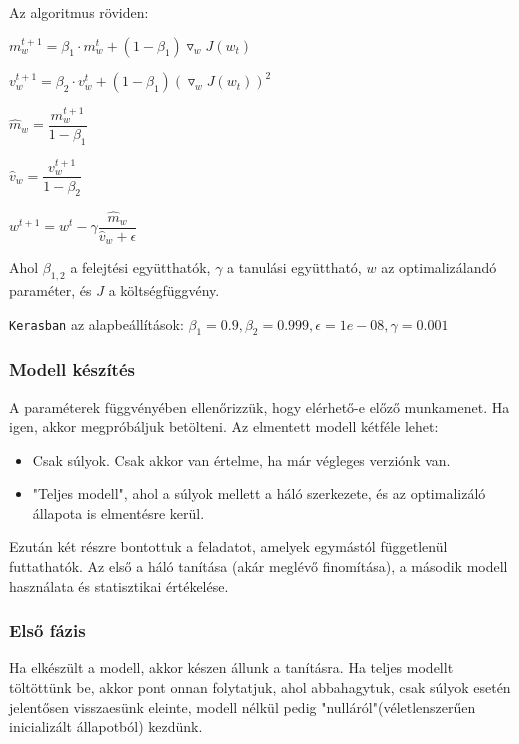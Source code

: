 \noindent
Az algoritmus röviden:

$ m_w^{t+1} = \beta_1 \cdot m_w^{t} + (1-\beta_1) \triangledown_w J(w_t) $

$ v_w^{t+1} = \beta_2 \cdot v_w^{t} + (1-\beta_1) (\triangledown_w J(w_t))^2 $

$ \hat{m}_w = \dfrac{m_w^{t+1}}{1 - \beta_1} $

$ \hat{v}_w = \dfrac{v_w^{t+1}}{1 - \beta_2} $

$ w^{t+1} = w^{t} - \gamma \dfrac{\hat{m}_w}{\hat{v}_w + \epsilon}   $

\noindent
Ahol $ \beta_{1,2} $ a felejtési együtthatók, $ \gamma $ a tanulási együttható,
$ w $ az optimalizálandó paraméter, és $ J $ a költségfüggvény.

\noindent
\texttt{Kerasban} az alapbeállítások: 
$ \beta_1=0.9, \beta_2=0.999, \epsilon=1e-08, \gamma=0.001 $



\subsubsection{Modell készítés}

A paraméterek függvényében ellenőrizzük, hogy elérhető-e előző munkamenet.
Ha igen, akkor megpróbáljuk betölteni. Az elmentett modell kétféle lehet:

\begin{itemize}
	\item 
	Csak súlyok. Csak akkor van értelme, ha már végleges verziónk van.
	\item 
	"Teljes modell", ahol a súlyok mellett a háló szerkezete, és az optimalizáló állapota
	is elmentésre kerül.
\end{itemize}



Ezután két részre bontottuk a feladatot, amelyek egymástól függetlenül futtathatók.
Az első a háló tanítása (akár meglévő finomítása), a második modell használata 
és statisztikai értékelése.


\subsubsection{Első fázis}

Ha elkészült a modell, akkor készen állunk a tanításra. Ha teljes modellt töltöttünk be,
akkor pont onnan folytatjuk, ahol abbahagytuk, csak súlyok esetén jelentősen visszaesünk 
eleinte, modell nélkül pedig "nulláról"(véletlenszerűen inicializált állapotból) kezdünk.

